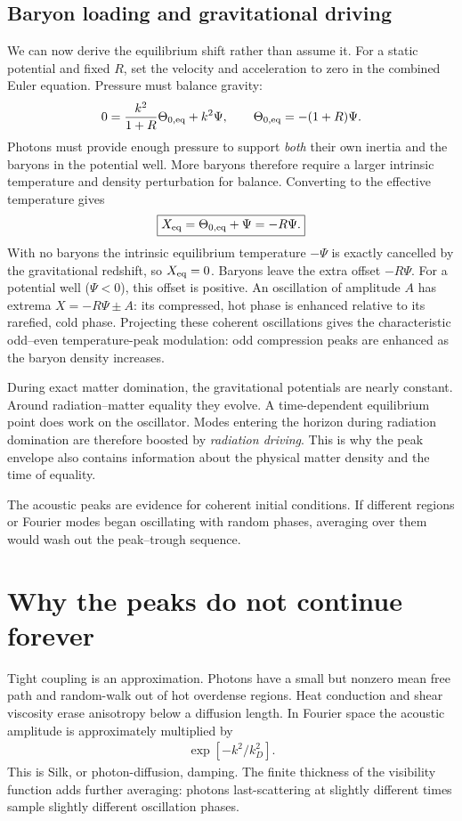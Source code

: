 \documentclass[12pt]{article}
\newcommand{\be}{\begin{eqnarray}}
\newcommand{\ee}{\end{eqnarray}}
\begin{document}
\subsection{Baryon loading and gravitational driving}
We can now derive the equilibrium shift rather than assume it. For a static
potential and fixed $R$, set the velocity and acceleration to zero in the combined
Euler equation. Pressure must balance gravity:
\[
0=\frac{k^2}{1+R}\Theta_{0,\rm eq}+k^2\Psi,
\qquad
\Theta_{0,\rm eq}=-(1+R)\Psi.
\]
Photons must provide enough pressure to support \emph{both} their own inertia and
the baryons in the potential well. More baryons therefore require a larger intrinsic
temperature and density perturbation for balance. Converting to the effective
temperature gives
\[
\boxed{X_{\rm eq}=\Theta_{0,\rm eq}+\Psi=-R\Psi.}
\]
With no baryons the intrinsic equilibrium temperature $-\Psi$ is exactly cancelled
by the gravitational redshift, so $X_{\rm eq}=0$. Baryons leave the extra offset
$-R\Psi$. For a potential well ($\Psi<0$), this offset is positive. An oscillation
of amplitude $A$ has extrema $X=-R\Psi\pm A$: its compressed, hot phase is enhanced
relative to its rarefied, cold phase. Projecting these coherent oscillations gives
the characteristic odd--even temperature-peak modulation: odd compression peaks
are enhanced as the baryon density increases.

During exact matter domination, the gravitational potentials are nearly constant.
Around radiation--matter equality they evolve. A time-dependent equilibrium point
does work on the oscillator. Modes entering the horizon during radiation domination
are therefore boosted by \emph{radiation driving}. This is why the peak envelope also
contains information about the physical matter density and the time of equality.

The acoustic peaks are evidence for coherent initial conditions. If different
regions or Fourier modes began oscillating with random phases, averaging over them
would wash out the peak--trough sequence.

\section{Why the peaks do not continue forever}

Tight coupling is an approximation. Photons have a small but nonzero mean free path
and random-walk out of hot overdense regions. Heat conduction and shear viscosity erase
anisotropy below a diffusion length. In Fourier space the acoustic amplitude is
approximately multiplied by
\be
\exp[-k^2/k_D^2].
\ee
This is Silk, or photon-diffusion, damping. The finite thickness of the visibility
function adds further averaging: photons last-scattering at slightly different times
sample slightly different oscillation phases.
\end{document}
